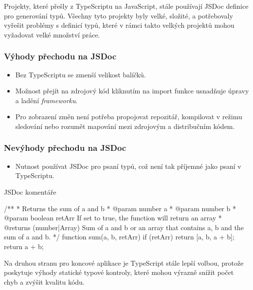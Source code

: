 Projekty, které přešly z TypeScriptu na JavaScript, stále používají JSDoc definice pro generování typů. Všechny tyto projekty byly velké, složité, a potřebovaly vyřešit problémy s definicí typů, které v rámci takto velkých projektů mohou vyžadovat velké množství práce. \cite{DitchingTypescript}

\subsubsection{Výhody přechodu na JSDoc}

\begin{itemize}
    \item Bez TypeScriptu se zmenší velikost balíčků.
    \item Možnost přejít na zdrojový kód kliknutím na import funkce usnadňuje úpravy a ladění \emph{frameworku}.
    \item Pro zobrazení změn není potřeba propojovat repozitář, kompilovat v režimu sledování nebo rozumět mapování mezi zdrojovým a distribučním kódem.
\end{itemize}

\subsubsection{Nevýhody přechodu na JSDoc}

\begin{itemize}
    \item Nutnost používat JSDoc pro psaní typů, což není tak příjemné jako psaní v TypeScriptu.
\end{itemize}

\begin{listing}[H]
    \caption{JSDoc komentáře \cite{JSDocExample}}
    \label{lst:jsdoc-example}
    \begin{code}[js]
/**
* Returns the sum of a and b
* @param {number} a
* @param {number} b
* @param {boolean} retArr If set to true, the function will return an array
* @returns {(number|Array)} Sum of a and b or an array that contains a, b and the sum of a and b.
*/
function sum(a, b, retArr) {
    if (retArr) {
        return [a, b, a + b];
    }
    return a + b;
}
    \end{code}
\end{listing}

Na druhou stranu pro koncové aplikace je TypeScript stále lepší volbou, protože poskytuje výhody statické typové kontroly, které mohou výrazně snížit počet chyb a zvýšit kvalitu kódu. \cite{FireshipTypescript}

